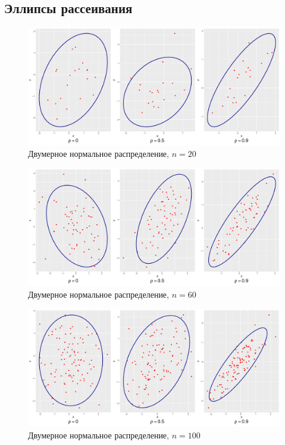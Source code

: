 \documentclass[a4paper]{article}
\begin{document}
\subsection{Эллипсы рассеивания}
\begin{figure}[H]
    \centering
    \includegraphics[width = \textwidth, height = 7 cm]{LabSrcs/resources/ellipse20.pdf}
    \caption{Двумерное нормальное распределение, $n=20$}
    \label{fig:el20}
\end{figure}
\begin{figure}[H]
    \centering
    \includegraphics[width = \textwidth, height = 7 cm]{LabSrcs/resources/ellipse60.pdf}
    \caption{Двумерное нормальное распределение, $n=60$}
    \label{fig:el60}
\end{figure}
\begin{figure}[H]
    \centering
    \includegraphics[width = \textwidth, height = 7 cm]{LabSrcs/resources/ellipse100.pdf}
    \caption{Двумерное нормальное распределение, $n=100$}
    \label{fig:el100}
\end{figure}
\end{document}
